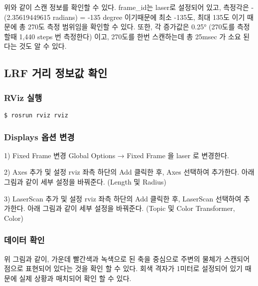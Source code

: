 위와 같이 스캔 정보를 확인할 수 있다. frame\_id는 laser로 설정되어 있고, 측정각은 -(2.35619449615 radians) = -135 degree 이기때문에 최소 -135도, 최대 135도 이기 때문에 총 270도 측정 범위임을 확인할 수 있다. 또한, 각 증가값은 0.25° (270도를 측정할때 1,440 steps 번 측정한다) 이고, 270도를 한번 스캔하는데 총 25msec 가 소요 된다는 것도 알 수 있다.

\subsection{LRF 거리 정보값 확인}

\subsubsection{RViz 실행}

\begin{lstlisting}[language=ROS]
$ rosrun rviz rviz
\end{lstlisting}

\subsubsection{Displays 옵션 변경}

1) Fixed Frame 변경
Global Options → Fixed Frame 을 laser 로 변경한다.

2) Axes 추가 및 설정
rviz 좌측 하단의 Add 클릭한 후, Axes 선택하여 추가한다.
아래 그림과 같이 세부 설정을 바꿔준다. (Length 및 Radius)

3) LaserScan 추가 및 설정
rviz 좌측 하단의 Add 클릭한 후, LaserScan 선택하여 추가한다.
아래 그림과 같이 세부 설정을 바꿔준다. (Topic 및 Color Transformer, Color)

\subsubsection{데이터 확인}

위 그림과 같이, 가운데 빨간색과 녹색으로 된 축을 중심으로 주변의 물체가 스캔되어 점으로 표현되어 있다는 것을 확인 할 수 있다. 회색 격자가 1미터로 설정되어 있기 때문에 실제 상황과 매치되어 확인 할 수 있다.

